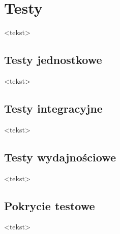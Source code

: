 \chapter{Testy}

<tekst>


\section{Testy jednostkowe}

<tekst>


\section{Testy integracyjne}

<tekst>


\section{Testy wydajnościowe}

<tekst>


\section{Pokrycie testowe}

<tekst>
